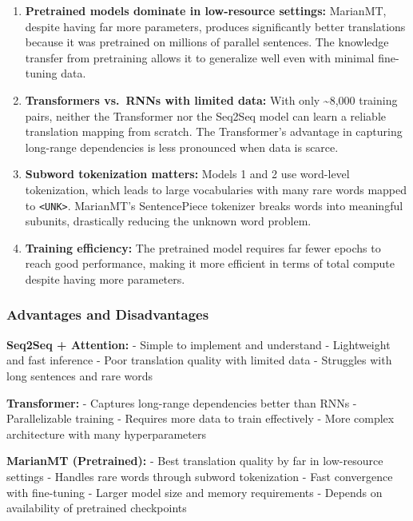 \documentclass[12pt,a4paper,oneside]{report}
\begin{document}
\begin{enumerate}
\def\labelenumi{\arabic{enumi}.}
\item
  \textbf{Pretrained models dominate in low-resource settings:} MarianMT, despite having far more parameters, produces significantly better translations because it was pretrained on millions of parallel sentences. The knowledge transfer from pretraining allows it to generalize well even with minimal fine-tuning data.
\item
  \textbf{Transformers vs.~RNNs with limited data:} With only \textasciitilde8,000 training pairs, neither the Transformer nor the Seq2Seq model can learn a reliable translation mapping from scratch. The Transformer's advantage in capturing long-range dependencies is less pronounced when data is scarce.
\item
  \textbf{Subword tokenization matters:} Models 1 and 2 use word-level tokenization, which leads to large vocabularies with many rare words mapped to \texttt{\textless{}UNK\textgreater{}}. MarianMT's SentencePiece tokenizer breaks words into meaningful subunits, drastically reducing the unknown word problem.
\item
  \textbf{Training efficiency:} The pretrained model requires far fewer epochs to reach good performance, making it more efficient in terms of total compute despite having more parameters.
\end{enumerate}

\hypertarget{advantages-and-disadvantages}{%
\subsubsection{Advantages and Disadvantages}\label{advantages-and-disadvantages}}

\textbf{Seq2Seq + Attention:}
- Simple to implement and understand
- Lightweight and fast inference
- Poor translation quality with limited data
- Struggles with long sentences and rare words

\textbf{Transformer:}
- Captures long-range dependencies better than RNNs
- Parallelizable training
- Requires more data to train effectively
- More complex architecture with many hyperparameters

\textbf{MarianMT (Pretrained):}
- Best translation quality by far in low-resource settings
- Handles rare words through subword tokenization
- Fast convergence with fine-tuning
- Larger model size and memory requirements
- Depends on availability of pretrained checkpoints
\end{document}
